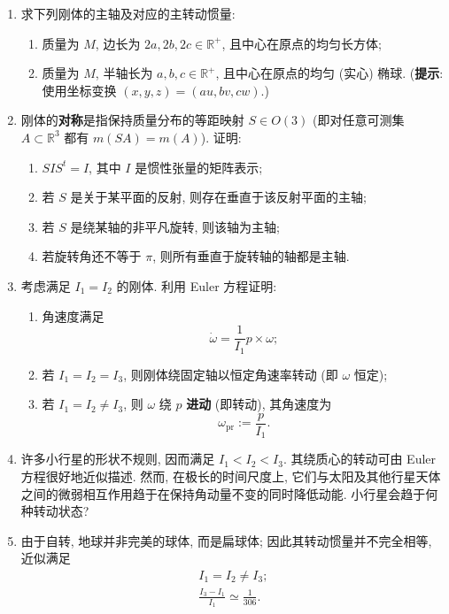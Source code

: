 \begin{RiemannExercise}
\begin{enumerate}[label=(\arabic*),ref=\arabic*,leftmargin=*]
\item\label{ex:principal-axes-of-box-and-ellipsoid} 求下列刚体的主轴及对应的主转动惯量:
\begin{enumerate}[label=(\alph*),leftmargin=*]
\item 质量为 $M$, 边长为 $2a,2b,2c\in\mathbb{R}^+$, 且中心在原点的均匀长方体;
\item 质量为 $M$, 半轴长为 $a,b,c\in\mathbb{R}^+$, 且中心在原点的均匀 (实心) 椭球. (\textbf{提示}: 使用坐标变换 $(x,y,z)=(au,bv,cw)$.)
\end{enumerate}
\item\label{ex:rigid-body-symmetries} 刚体的\textbf{对称}是指保持质量分布的等距映射 $S\in O(3)$ (即对任意可测集 $A\subset\mathbb{R}^3$ 都有 $m(SA)=m(A)$). 证明:
\begin{enumerate}[label=(\alph*),leftmargin=*]
\item $SIS^t=I$, 其中 $I$ 是惯性张量的矩阵表示;
\item 若 $S$ 是关于某平面的反射, 则存在垂直于该反射平面的主轴;
\item 若 $S$ 是绕某轴的非平凡旋转, 则该轴为主轴;
\item 若旋转角还不等于 $\pi$, 则所有垂直于旋转轴的轴都是主轴.
\end{enumerate}
\item\label{ex:free-symmetric-top} 考虑满足 $I_1=I_2$ 的刚体. 利用 Euler 方程证明:
\begin{enumerate}[label=(\alph*),leftmargin=*]
\item 角速度满足
\[
  \dot\omega=\frac{1}{I_1}p\times\omega;
\]
\item 若 $I_1=I_2=I_3$, 则刚体绕固定轴以恒定角速率转动 (即 $\omega$ 恒定);
\item 若 $I_1=I_2\ne I_3$, 则 $\omega$ 绕 $p$ \textbf{进动} (即转动), 其角速度为
\[
  \omega_{\mathrm{pr}}:=\frac{p}{I_1}.
\]
\end{enumerate}
\item\label{ex:asteroid-rotation} 许多小行星的形状不规则, 因而满足 $I_1<I_2<I_3$. 其绕质心的转动可由 Euler 方程很好地近似描述. 然而, 在极长的时间尺度上, 它们与太阳及其他行星天体之间的微弱相互作用趋于在保持角动量不变的同时降低动能. 小行星会趋于何种转动状态?
\item\label{ex:chandler-precession} 由于自转, 地球并非完美的球体, 而是扁球体; 因此其转动惯量并不完全相等, 近似满足
\[
  \begin{gathered}
    I_1=I_2\ne I_3;\\
    \frac{I_3-I_1}{I_1}\simeq\frac{1}{306}.
  \end{gathered}
\]
\end{enumerate}
\end{RiemannExercise}
